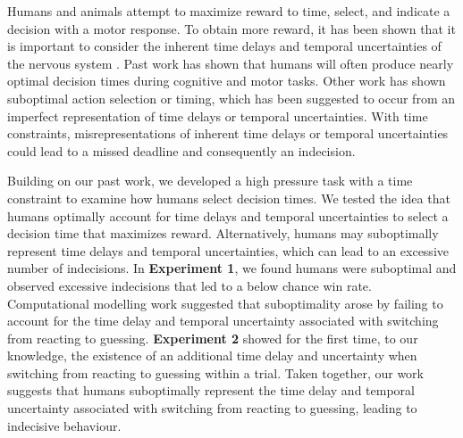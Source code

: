 \documentclass[12pt]{article}
\newcommand\boldblue[1]{\textcolor{mydarkblue}{\textbf{#1}}}
\begin{document}
Humans and animals attempt to maximize reward to time, select, and indicate a decision with a motor response\autocite*{drugowitschOptimalDecisionmakingTimevarying2014,balciOptimalTemporalRisk2011,bogaczPhysicsOptimalDecision2006,hudsonOptimalCompensationTemporal2008,trommershauserHumansRapidlyEstimate2006}. To obtain more reward, it has been shown that it is important to consider the inherent time delays and temporal uncertainties of the nervous system \autocite*{drugowitschTuningSpeedaccuracyTradeoff2015,balciOptimalTemporalRisk2011,hudsonOptimalCompensationTemporal2008,acerbiInternalRepresentationsTemporal2012,faisalNoiseNervousSystem2008,kordingBayesianDecisionTheory2006,wolpertMotorControlDecisionmaking2012,tanisAccuracyEffortCosts2023,lokeshVisualAccuracyDominates2023}. Past work has shown that humans will often produce nearly optimal decision times during cognitive\autocite*{balciOptimalTemporalRisk2011,mileticCautionDecisionmakingTime2019} and motor tasks\autocite*{hudsonOptimalCompensationTemporal2008,faisalOptimalCombinationSensory2009}. Other work has shown suboptimal action selection or timing, which has been suggested to occur from an imperfect representation of time delays or temporal uncertainties\autocite*{otaMotorPlanningTemporal2015,drugowitschComputationalPrecisionMental2016, onagawaSensorimotorStrategySelection2021,onagawaRiskAversionAdjustment2019}. With time constraints, misrepresentations of inherent time delays or temporal uncertainties could lead to a missed deadline and consequently an indecision. 

Building on our past work\autocite{lokeshHumansUtilizeSensory2022}, we developed a high pressure task with a time constraint to examine how humans select decision times. We tested the idea that humans optimally account for time delays and temporal uncertainties to select a decision time that maximizes reward. Alternatively, humans may suboptimally represent time delays and temporal uncertainties, which can lead to an excessive number of indecisions. In \boldblue{Experiment 1}, we found humans were suboptimal and observed excessive indecisions that led to a below chance win rate. Computational modelling work suggested that suboptimality arose by failing to account for the time delay and temporal uncertainty associated with switching from reacting to guessing. \boldblue{Experiment 2} showed for the first time, to our knowledge, the existence of an additional time delay and uncertainty when switching from reacting to guessing within a trial. Taken together, our work suggests that humans suboptimally represent the time delay and temporal uncertainty associated with switching from reacting to guessing, leading to indecisive behaviour. 
\end{document}
